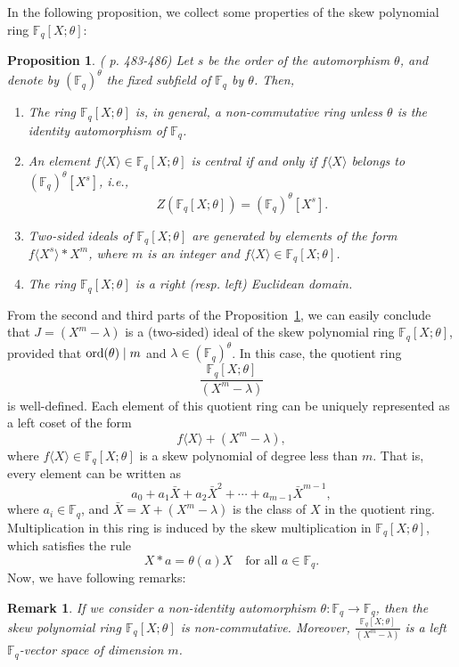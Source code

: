 \documentclass[12pt]{article}
\newtheorem{proposition}{Proposition}
\newtheorem{remark}{Remark}
\begin{document}
In the following proposition, we collect some properties of the skew polynomial ring $\mathbb{F}_q[X;\theta]$:

\begin{proposition}\label{6Proposition3} (\cite{ore1933theory} p. 483-486)
	Let $s$ be the order of the automorphism $\theta$, and denote by $(\mathbb{F}_q)^\theta$ the fixed subfield of $\mathbb{F}_q$ by $\theta$. Then,
	\begin{enumerate}
		\item [(i)]  The ring $\mathbb{F}_q[X;\theta]$ is, in general, a non-commutative ring unless $\theta$ is the identity automorphism of $\mathbb{F}_q$.
		\item [(ii)] An element $f\langle X \rangle \in \mathbb{F}_q[X;\theta]$ is central if and only if $f\langle X \rangle$ belongs to $(\mathbb{F}_q)^\theta[X^s]$, i.e., 
		\[ Z(\mathbb{F}_q[X;\theta]) = (\mathbb{F}_q)^\theta[X^s]. \]
		\item [(iii)]  Two-sided ideals of $\mathbb{F}_q[X;\theta]$ are generated by elements of the form $f\langle X^s\rangle\ast X^m$, where $m$ is an integer and $f\langle X \rangle \in \mathbb{F}_q[X;\theta]$.
		\item [(iv)] The ring $\mathbb{F}_q[X;\theta]$ is a right (resp. left) Euclidean domain.
	\end{enumerate}
\end{proposition} 
From the second and third parts of the Proposition~\ref{6Proposition3}, we can easily conclude that \(J = (X^m - \lambda)\) is a (two-sided) ideal of the skew polynomial ring \(\mathbb{F}_q[X;\theta]\), provided that \(\textup{ord}(\theta) \mid m\) and \(\lambda \in (\mathbb{F}_q)^\theta\). In this case, the quotient ring
\[
\frac{\mathbb{F}_q[X;\theta]}{(X^m - \lambda)}
\]
is well-defined. Each element of this quotient ring can be uniquely represented as a left coset of the form
\[
f\langle X \rangle + (X^m - \lambda),
\]
where \(f\langle X \rangle \in \mathbb{F}_q[X;\theta]\) is a skew polynomial of degree less than \(m\). That is, every element can be written as
\[
a_0 + a_1 \bar{X} + a_2 \bar{X}^2 + \cdots + a_{m-1} \bar{X}^{m-1},
\]
where \(a_i \in \mathbb{F}_q\), and \(\bar{X} = X + (X^m - \lambda)\) is the class of \(X\) in the quotient ring. Multiplication in this ring is induced by the skew multiplication in \(\mathbb{F}_q[X;\theta]\), which satisfies the rule
\[
X\ast a = \theta(a)X \quad \text{for all } a \in \mathbb{F}_q.
\]
\quad Now, we have following remarks:
\begin{remark}
If we consider a non-identity automorphism \(\theta: \mathbb{F}_q \rightarrow \mathbb{F}_q\), then the skew polynomial ring \(\mathbb{F}_q[X; \theta]\) is non-commutative. Moreover, \(\frac{\mathbb{F}_q[X; \theta]}{(X^m - \lambda)}\) is a left \(\mathbb{F}_q\)-vector space of dimension \(m\).
\end{remark}
\end{document}
